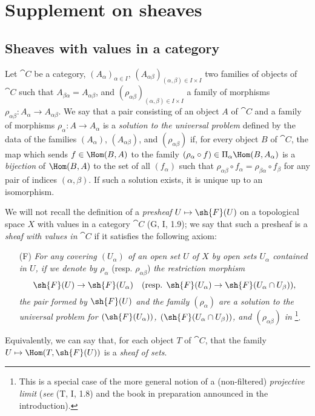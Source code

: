 \section{Supplement on sheaves}
\label{section:0.3}

\subsection{Sheaves with values in a category}
\label{subsection:0.3.1}

\begin{env}[3.1.1]
\label{0.3.1.1}
Let $\cat{C}$ be a category, $(A_\alpha)_{\alpha\in I}$,
$(A_{\alpha\beta})_{(\alpha,\beta)\in I\times I}$ two families of objects of
$\cat{C}$ such that $A_{\beta\alpha}=A_{\alpha\beta}$, and
$(\rho_{\alpha\beta})_{(\alpha,\beta)\in I\times I}$ a family of morphisms
$\rho_{\alpha\beta}:A_\alpha\to A_{\alpha\beta}$. We say that a pair consisting
of an object $A$ of $\cat{C}$ and a family of morphisms $\rho_\alpha:A\to A_\alpha$
is a \emph{solution to the universal problem} defined by the data of the
families $(A_\alpha)$, $(A_{\alpha\beta})$, and $(\rho_{\alpha\beta})$ if, for
every object $B$ of $\cat{C}$, the map which sends $f\in\Hom(B,A)$ to the family
$(\rho_\alpha\circ f)\in\Pi_\alpha\Hom(B,A_\alpha)$ is a \emph{bijection} of
$\Hom(B,A)$ to the set of all $(f_\alpha)$ such that
$\rho_{\alpha\beta}\circ f_\alpha=\rho_{\beta\alpha}\circ f_\beta$ for any pair
of indices $(\alpha,\beta)$. If such a solution exists, it is unique up to an
isomorphism.
\end{env}

\begin{env}[3.1.2]
\label{0.3.1.2}
We will not recall the definition of a \emph{presheaf} $U\mapsto\sh{F}(U)$ on a
topological space $X$ with values in a category $\cat{C}$ (G, I, 1.9); we say that
such a presheaf is a \emph{sheaf with values in} $\cat{C}$ if it satisfies the
following axiom:
\begin{enumerate}
  \item[(F)] \emph{For any covering $(U_\alpha)$ of an open set $U$ of $X$ by open sets $U_\alpha$ contained in $U$, if we denote by $\rho_\alpha$} (resp. $\rho_{\alpha\beta}$) \emph{the restriction morphism}
    \[
      \sh{F}(U)\to\sh{F}(U_\alpha)
      \quad(\text{resp. }\sh{F}(U_\alpha)\to\sh{F}(U_\alpha\cap U_\beta)),
    \]
    \emph{the pair formed by $\sh{F}(U)$ and the family $(\rho_\alpha)$ are a
    solution to the universal problem for $(\sh{F}(U_\alpha))$,
    $(\sh{F}(U_\alpha\cap U_\beta))$, and $(\rho_{\alpha\beta})$ in
    }\footnote{This is a special case of the more general
    notion of a (non-filtered) \emph{projective limit} (\emph{see} (T, I, 1.8)
    and the book in preparation announced in the introduction).}.\\
\end{enumerate}

Equivalently, we can say that, for each object $T$ of $\cat{C}$, that the family $U\mapsto\Hom(T,\sh{F}(U))$ is a \emph{sheaf of sets}.
\end{env}

